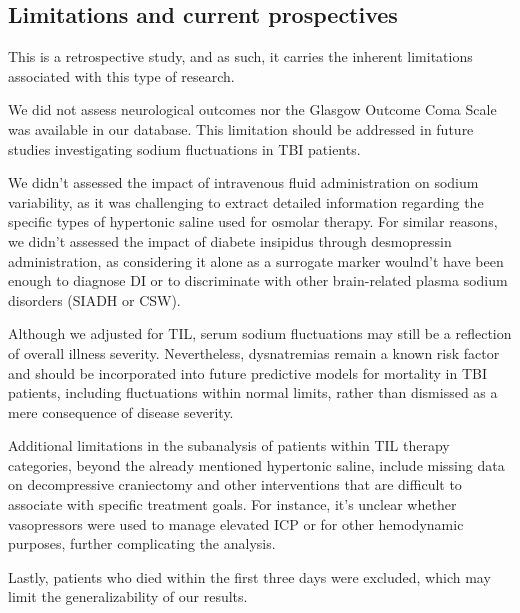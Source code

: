 
\subsection{Limitations and current prospectives}
This is a retrospective study, and as such, it carries the inherent limitations associated with this type of research.

We did not assess neurological outcomes nor the Glasgow Outcome Coma Scale was available in our database. This limitation should be addressed in future studies investigating sodium fluctuations in TBI patients.

We didn't assessed the impact of intravenous fluid administration on sodium variability, as it was challenging to extract detailed information regarding the specific types of hypertonic saline\cite{holdenHypertonicSalineUse2023a} used for osmolar therapy.
For similar reasons, we didn't assessed the impact of diabete insipidus through desmopressin administration, as considering it alone as a surrogate marker woulnd't have been enough to diagnose DI or to discriminate with other brain-related plasma sodium disorders (SIADH or CSW). 

Although we adjusted for TIL, serum sodium fluctuations may still be a reflection of overall illness severity. Nevertheless, dysnatremias remain a known risk factor and should be incorporated into future predictive models for mortality in TBI patients, including fluctuations within normal limits, rather than dismissed as a mere consequence of disease severity.

Additional limitations in the subanalysis of patients within TIL therapy categories, beyond the already mentioned hypertonic saline, include missing data on decompressive craniectomy\cite{kimRecentUpdatesControversies2023a} and other interventions that are difficult to associate with specific treatment goals. For instance, it’s unclear whether vasopressors were used to manage elevated ICP or for other hemodynamic purposes, further complicating the analysis.

Lastly, patients who died within the first three days were excluded, which may limit the generalizability of our results.



